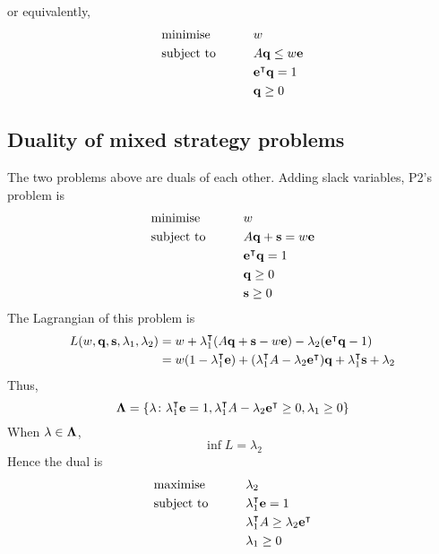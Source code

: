 or equivalently,
\begin{alignat*}{2}
	 & \text{minimise}   & \qquad & w                          \\
	 & \text{subject to} &        & A \vb q \leq w \vb e       \\
	 &                   &        & \vb e^\intercal \vb q = 1 \\
	 &                   &        & \vb q \geq 0
\end{alignat*}

\subsection{Duality of mixed strategy problems}
The two problems above are duals of each other.
Adding slack variables, P2's problem is
\begin{alignat*}{2}
	 & \text{minimise}   & \qquad & w                          \\
	 & \text{subject to} &        & A \vb q + \vb s = w \vb e  \\
	 &                   &        & \vb e^\intercal \vb q = 1 \\
	 &                   &        & \vb q \geq 0               \\
	 &                   &        & \vb s \geq 0
\end{alignat*}
The Lagrangian of this problem is
\begin{align*}
	L(w, \vb q, \vb s, \vb\lambda_1, \lambda_2) & = w + \vb\lambda_1^\intercal (A\vb q + \vb s - w\vb e) - \lambda_2 (\vb e^\intercal \vb q - 1)                                                    \\
	                                            & = w(1 - \vb\lambda_1^\intercal \vb e) + (\vb\lambda_1^\intercal A - \lambda_2 \vb e^\intercal) \vb q + \vb \lambda_1^\intercal\vb s + \lambda_2
\end{align*}
Thus,
\[
	\vb\Lambda = \qty{\vb\lambda \colon \vb\lambda_1^\intercal\vb e = 1, \vb\lambda_1^\intercal A - \lambda_2\vb e^\intercal\geq 0, \vb \lambda_1 \geq 0}
\]
When \( \vb\lambda \in \vb\Lambda \),
\[
	\inf L = \lambda_2
\]
Hence the dual is
\begin{alignat*}{2}
	 & \text{maximise}   & \qquad & \lambda_2                                                 \\
	 & \text{subject to} &        & \vb\lambda_1^\intercal \vb e = 1                         \\
	 &                   &        & \vb\lambda_1^\intercal A \geq \lambda_2 \vb e^\intercal \\
	 &                   &        & \vb \lambda_1 \geq 0
\end{alignat*}
